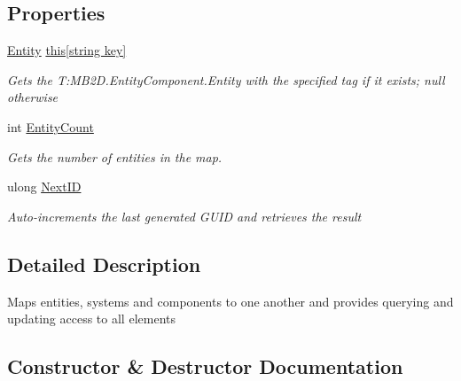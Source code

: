 \subsection*{Properties}
\begin{DoxyCompactItemize}
\item 
\hyperlink{class_m_b2_d_1_1_entity_component_1_1_entity}{Entity} \hyperlink{class_m_b2_d_1_1_entity_component_1_1_entity_map_ae29ad08673cc4c756b43bd3a72c35b84}{this\mbox{[}string key\mbox{]}}
\begin{DoxyCompactList}\small\item\em Gets the T\+:\+M\+B2\+D.\+Entity\+Component.\+Entity with the specified tag if it exists; null otherwise \end{DoxyCompactList}\item 
int \hyperlink{class_m_b2_d_1_1_entity_component_1_1_entity_map_a607d25be9724ca759ecef96fe76ee516}{Entity\+Count}
\begin{DoxyCompactList}\small\item\em Gets the number of entities in the map. \end{DoxyCompactList}\item 
ulong \hyperlink{class_m_b2_d_1_1_entity_component_1_1_entity_map_a812155313251122f297b6653ab4f4ec1}{Next\+ID}
\begin{DoxyCompactList}\small\item\em Auto-\/increments the last generated G\+U\+ID and retrieves the result \end{DoxyCompactList}\end{DoxyCompactItemize}


\subsection{Detailed Description}
Maps entities, systems and components to one another and provides querying and updating access to all elements 



\subsection{Constructor \& Destructor Documentation}
\hypertarget{class_m_b2_d_1_1_entity_component_1_1_entity_map_a3904c9181b806e476be24848837e1b53}{}\label{class_m_b2_d_1_1_entity_component_1_1_entity_map_a3904c9181b806e476be24848837e1b53} 
